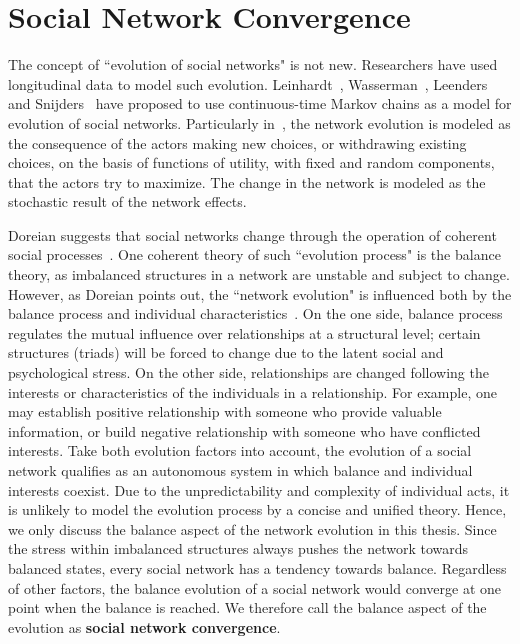 \section{Social Network Convergence}
The concept of ``evolution of social networks" is not new. Researchers have used longitudinal data to model such evolution. Leinhardt~\cite{Leinhardt:77a}, Wasserman~\cite{Wasserman:80}, Leenders~\cite{Leenders:95} and Snijders~\cite{Snijders:01} have  proposed to use continuous-time Markov chains as a model for evolution of social networks. Particularly in~\cite{Snijders:01}, the network evolution is modeled as the consequence of the actors making new choices, or withdrawing existing choices, on the basis of functions of utility, with fixed and random components, that the actors try to maximize. The change in the network is modeled as the stochastic result of the network effects.

Doreian suggests that social networks change through the operation of coherent social processes~\cite{Doreian:02}.
One coherent theory of such ``evolution process" is the balance theory, as imbalanced structures in a network are unstable and subject to change. However, as Doreian points out, the ``network evolution" is influenced both by the balance process and individual characteristics~\cite{Doreian:02}. On the one side, balance process regulates the mutual influence over relationships at a structural level; certain structures (triads) will be forced to change due to the latent social and psychological stress. On the other side, relationships are changed following the interests or characteristics of the individuals in a relationship. For example, one may establish positive relationship with someone who provide valuable information, or build negative relationship with someone who have conflicted interests. Take both evolution factors into account, the evolution of a social network qualifies as an autonomous system in which balance and individual interests coexist. Due to the unpredictability and complexity of individual acts, it is unlikely to model the evolution process by a concise and unified theory. Hence, we only discuss the balance aspect of the network evolution in this thesis. Since the stress within imbalanced structures always pushes the network towards balanced states, every social network has a tendency towards balance. Regardless of other factors, the balance evolution of a social network would converge at one point when the balance is reached.  We therefore call the balance aspect of the evolution as {\bf social network convergence}. 

